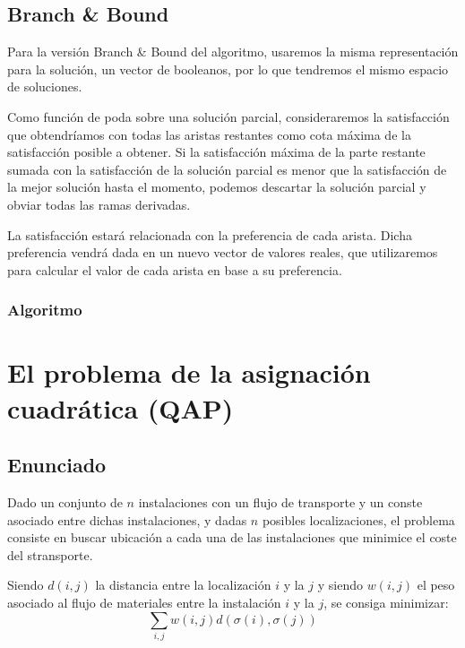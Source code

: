 \documentclass[a4paper, 11pt]{article} %
\begin{document}
        \subsection{Branch \& Bound}
	  Para la versión Branch \& Bound del algoritmo, usaremos la misma representación para la solución, 
	  un vector de booleanos, por lo que tendremos el mismo espacio de soluciones.
	  
	  Como función de poda sobre una solución parcial, consideraremos la satisfacción que obtendríamos con todas 
	  las aristas restantes como cota máxima de la satisfacción posible a obtener. Si la satisfacción máxima de 
	  la parte restante sumada con la satisfacción de la solución parcial es menor que la satisfacción de la mejor 
	  solución hasta el momento, podemos descartar la solución parcial y obviar todas las ramas derivadas. 
	  
	  La satisfacción estará relacionada con la preferencia de cada arista. Dicha preferencia vendrá dada en un 
	  nuevo vector de valores reales, que utilizaremos para calcular el valor de cada arista en base a su preferencia. 
        
        \subsubsection{Algoritmo}    
        \small
        \texttt{}
        \normalsize
        
        \section{El problema de la asignación cuadrática (QAP)}
	  \subsection{Enunciado}
	    Dado un conjunto de $n$ instalaciones con un flujo de transporte y
	    un conste asociado entre dichas instalaciones, y dadas $n$ posibles localizaciones,
	    el problema consiste en buscar ubicación a cada una de las instalaciones que
	    minimice el coste del stransporte.
	    
	    Siendo $d(i,j)$ la distancia entre la localización $i$ y la $j$
	    y siendo $w(i,j)$ el peso asociado al flujo de materiales entre la instalación
	    $i$ y la $j$, se consiga minimizar:
	    \begin{equation}
	    \sum_{i,j} w(i,j) d(\sigma(i),\sigma(j))
	    \label{coste}
	    \end{equation}
\end{document}
